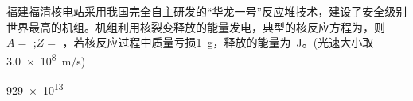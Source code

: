 福建福清核电站采用我国完全自主研发的“华龙一号”反应堆技术，建设了安全级别世界最高的机组。机组利用核裂变释放的能量发电，典型的核反应方程为，则\(A =\) \lunl{3em};\(Z =\) \lunl{3em}，若核反应过程中质量亏损\qty{1}{\g}，释放的能量为\lunl{5em}\qty{}{J}。(光速大小取\qty{3.0e8}{m/s})
\begin{answer}
	92\quad\qty{9e13}{}
\end{answer}